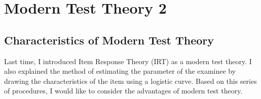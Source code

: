 \documentclass{ltjsbook}
\begin{document}
\chapter{Modern Test Theory 2}
\label{x05_GRM}

\section{Characteristics of Modern Test Theory}
Last time, I introduced Item Response Theory (IRT) as a modern test theory. I also explained the method of estimating the parameter of the examinee by drawing the characteristics of the item using a logistic curve. Based on this series of procedures, I would like to consider the advantages of modern test theory.
\end{document}
